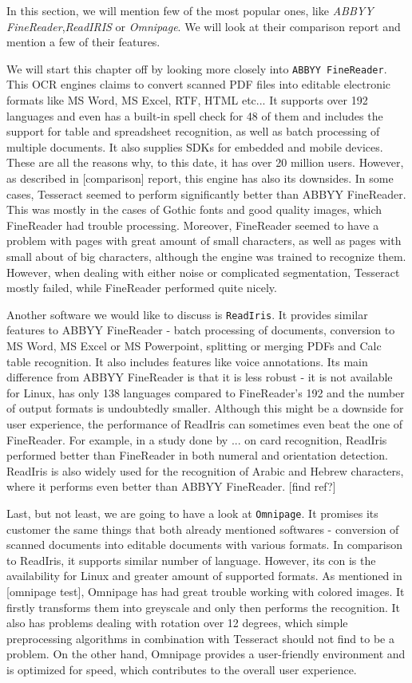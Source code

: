 In this section, we will mention few of the most popular ones, like \emph{ABBYY FineReader},\emph{ReadIRIS} or \emph{Omnipage}. We will look at their comparison report and mention a few of their features.


We will start this chapter off by looking more closely into \texttt{ABBYY FineReader}. This OCR engines claims to convert scanned PDF files into editable electronic formats like MS Word, MS Excel, RTF, HTML etc... It supports over 192 languages and even has a built-in spell check for 48 of them and includes the support for table and spreadsheet recognition, as well as batch processing of multiple documents. It also supplies SDKs for embedded and mobile devices. These are all the reasons why, to this date, it has over 20 million users. However, as described in [comparison] report, this engine has also its downsides. In some cases, Tesseract seemed to perform significantly better than ABBYY FineReader. This was mostly in the cases of Gothic fonts and good quality images, which FineReader had trouble processing. Moreover, FineReader seemed to have a problem with pages with great amount of small characters, as well as pages with small about of big characters, although the engine was trained to recognize them. However, when dealing with either noise or complicated segmentation, Tesseract mostly failed, while FineReader performed quite nicely.

Another software we would like to discuss is \texttt{ReadIris}. It provides similar features to ABBYY FineReader - batch processing of documents, conversion to MS Word, MS Excel or MS Powerpoint, splitting or merging PDFs and Calc table recognition. It also includes features like voice annotations. Its main difference from ABBYY FineReader is that it is less robust - it is not available for Linux, has only 138 languages compared to FineReader's 192 and the number of output formats is undoubtedly smaller. Although this might be a downside for user experience, the performance of ReadIris can sometimes even beat the one of FineReader. For example, in a study done by ... on card recognition, ReadIris performed better than FineReader in both numeral and orientation detection. ReadIris is also widely used for the recognition of Arabic and Hebrew characters, where it performs even better than ABBYY FineReader. [find ref?]

Last, but not least, we are going to have a look at \texttt{Omnipage}. It promises its customer the same things that both already mentioned softwares - conversion of scanned documents into editable documents with various formats. In comparison to ReadIris, it supports similar number of language. However, its con is the availability for Linux and greater amount of supported formats. As mentioned in [omnipage test], Omnipage has had great trouble working with colored images. It firstly transforms them into greyscale and only then performs the recognition. It also has problems dealing with rotation over 12 degrees, which simple preprocessing algorithms in combination with Tesseract should not find to be a problem. On the other hand, Omnipage provides a user-friendly environment and is optimized for speed, which contributes to the overall user experience.


